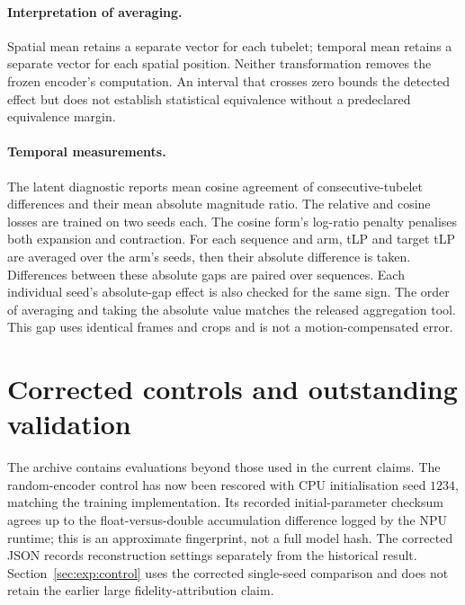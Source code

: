 \paragraph{Interpretation of averaging.}
Spatial mean retains a separate vector for each tubelet; temporal mean retains
a separate vector for each spatial position.
Neither transformation removes the frozen encoder's computation.
An interval that crosses zero bounds the detected effect but does not establish
statistical equivalence without a predeclared equivalence margin.

\paragraph{Temporal measurements.}
The latent diagnostic reports mean cosine agreement of consecutive-tubelet
differences and their mean absolute magnitude ratio.
The relative and cosine losses are trained on two seeds each.
The cosine form's log-ratio penalty penalises both expansion and contraction.
For each sequence and arm, tLP and target tLP are averaged over the arm's
seeds, then their absolute difference is taken. Differences between these
absolute gaps are paired over sequences. Each individual seed's absolute-gap
effect is also checked for the same sign.
The order of averaging and taking the absolute value matches the released
aggregation tool. This gap uses identical frames and crops and is not a
motion-compensated error.

\section{Corrected controls and outstanding validation}\label{app:pending}

The archive contains evaluations beyond those used in the current claims.
The random-encoder control has now been rescored with CPU initialisation seed
$1234$, matching the training implementation. Its recorded initial-parameter
checksum agrees up to the float-versus-double accumulation difference logged
by the NPU runtime; this is an approximate fingerprint, not a full model hash.
The corrected JSON records reconstruction settings separately from the
historical result. Section~\ref{sec:exp:control} uses the corrected single-seed
comparison and does not retain the earlier large fidelity-attribution claim.

